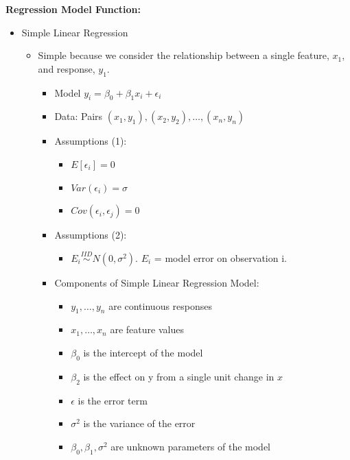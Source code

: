 \documentclass{article}
\begin{document}
\textbf{Regression Model Function:}
\begin{itemize}
    \item Simple Linear Regression
    \begin{itemize}
        \item Simple because we consider the relationship between a single feature, $x_{1}$, and response, $y_{1}$.
        \begin{itemize}
            \item Model $y_{i} = \beta_{0} + \beta_{1}x_{i} + \epsilon_{i}$
            \item Data: Pairs $(x_{1}, y_{1}), (x_{2}, y_{2}), \ldots, (x_{n}, y_{n})$
            \item Assumptions (1):
            \begin{itemize}
                \item $E[\epsilon_{i}] = 0$
                \item $Var(\epsilon_{i}) = \sigma$
                \item $Cov(\epsilon_{i}, \epsilon_{j}) = 0$
            \end{itemize}
            \item Assumptions (2):
            \begin{itemize}
                \item $E_{i} \stackrel{IID}{\sim} N(0, \sigma^2)$. $E_{i}$ = model error on observation i.
            \end{itemize}
            \item Components of Simple Linear Regression Model:
            \begin{itemize}
                \item $y_{1}, \ldots, y_{n}$ are continuous responses
                \item $x_{1}, \ldots, x_{n}$ are feature values
                \item $\beta_{0}$ is the intercept of the model
                \item $\beta_{2}$ is the effect on y from a single unit change in $x$
                \item $\epsilon$ is the error term
                \item $\sigma^2$ is the variance of the error
                \item $\beta_{0}, \beta_{1}, \sigma^2$ are unknown parameters of the model
            \end{itemize}
        \end{itemize}
    \end{itemize}
\end{itemize}
\end{document}
